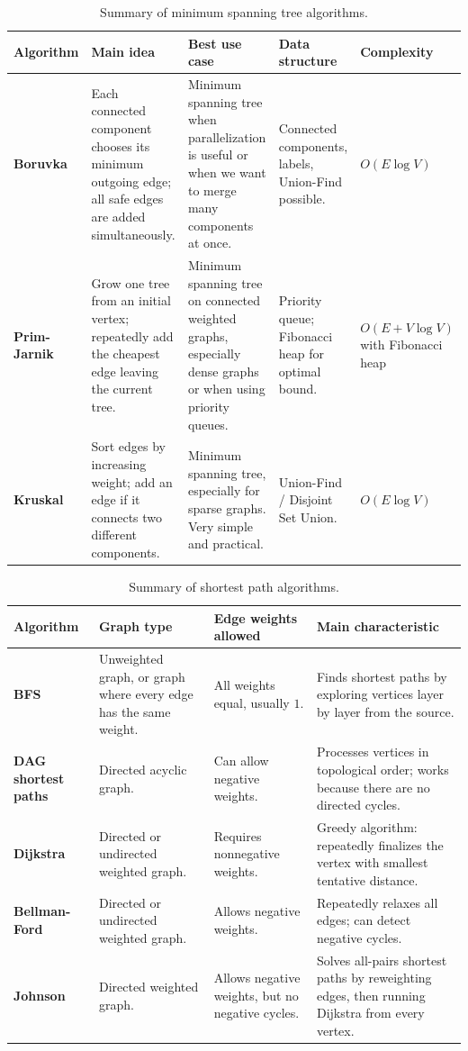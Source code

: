 \documentclass[11pt]{article}
\begin{document}
\begin{table}[h!]
\centering
\small
\begin{tabularx}{\textwidth}{>{\bfseries}p{2.4cm} X X p{2.5cm} p{2.2cm}}
\toprule
Algorithm & Main idea & Best use case & Data structure & Complexity \\
\midrule
Boruvka &
Each connected component chooses its minimum outgoing edge; all safe edges are added simultaneously. &
Minimum spanning tree when parallelization is useful or when we want to merge many components at once. &
Connected components, labels, Union-Find possible. &
$O(E \log V)$ \\
\midrule
Prim-Jarnik &
Grow one tree from an initial vertex; repeatedly add the cheapest edge leaving the current tree. &
Minimum spanning tree on connected weighted graphs, especially dense graphs or when using priority queues. &
Priority queue; Fibonacci heap for optimal bound. &
$O(E + V \log V)$ with Fibonacci heap \\
\midrule
Kruskal &
Sort edges by increasing weight; add an edge if it connects two different components. &
Minimum spanning tree, especially for sparse graphs. Very simple and practical. &
Union-Find / Disjoint Set Union. &
$O(E \log V)$ \\
\bottomrule
\end{tabularx}
\caption{Summary of minimum spanning tree algorithms.}
\end{table}

\begin{table}[h!]
\centering
\small
\begin{tabularx}{\textwidth}{>{\bfseries}p{2.8cm} X X X}
\toprule
Algorithm & Graph type & Edge weights allowed & Main characteristic \\
\midrule
BFS &
Unweighted graph, or graph where every edge has the same weight. &
All weights equal, usually $1$. &
Finds shortest paths by exploring vertices layer by layer from the source. \\
\midrule
DAG shortest paths &
Directed acyclic graph. &
Can allow negative weights. &
Processes vertices in topological order; works because there are no directed cycles. \\
\midrule
Dijkstra &
Directed or undirected weighted graph. &
Requires nonnegative weights. &
Greedy algorithm: repeatedly finalizes the vertex with smallest tentative distance. \\
\midrule
Bellman-Ford &
Directed or undirected weighted graph. &
Allows negative weights. &
Repeatedly relaxes all edges; can detect negative cycles. \\
\midrule
Johnson &
Directed weighted graph. &
Allows negative weights, but no negative cycles. &
Solves all-pairs shortest paths by reweighting edges, then running Dijkstra from every vertex. \\
\bottomrule
\end{tabularx}
\caption{Summary of shortest path algorithms.}
\end{table}
\end{document}
